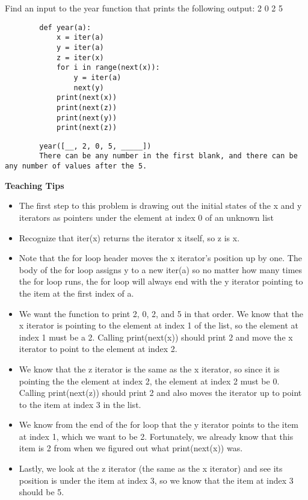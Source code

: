 \begin{blocksection}
    \question Find an input to the year function that prints the following output:
    2
    0
    2
    5
    
    \begin{lstlisting}
        def year(a):
            x = iter(a)
            y = iter(a)
            z = iter(x)
            for i in range(next(x)):
                y = iter(a)
                next(y)
            print(next(x))
            print(next(z))
            print(next(y))
            print(next(z))
    \end{lstlisting}
    
    \begin{solution}[1in]
    \begin{lstlisting}
        year([__, 2, 0, 5, _____])
        There can be any number in the first blank, and there can be any number of values after the 5.
    \end{lstlisting}
    \end{solution}
    \end{blocksection}
    
    \begin{guide}
    \begin{blocksection}
        \textbf{Teaching Tips}
        \begin{itemize}
        \item The first step to this problem is drawing out the initial states of the x and y iterators as pointers under the element at index 0 of an unknown list
        \item Recognize that iter(x) returns the iterator x itself, so z is x.
        \item Note that the for loop header moves the x iterator's position up by one. The body of the for loop assigns y to a new iter(a) so no matter how many times the for loop runs, the for loop will always end with the y iterator pointing to the item at the first index of a.
        \item We want the function to print 2, 0, 2, and 5 in that order. We know that the x iterator is pointing to the element at index 1 of the list, so the element at index 1 must be a 2. Calling print(next(x)) should print 2 and move the x iterator to point to the element at index 2.
        \item We know that the z iterator is the same as the x iterator, so since it is pointing the the element at index 2, the element at index 2 must be 0. Calling print(next(z)) should print 2 and also moves the iterator up to point to the item at index 3 in the list.
        \item We know from the end of the for loop that the y iterator points to the item at index 1, which we want to be 2. Fortunately, we already know that this item is 2 from when we figured out what print(next(x)) was.
        \item Lastly, we look at the z iterator (the same as the x iterator) and see its position is under the item at index 3, so we know that the item at index 3 should be 5. 
        \end{itemize}
    \end{blocksection}
    \end{guide}